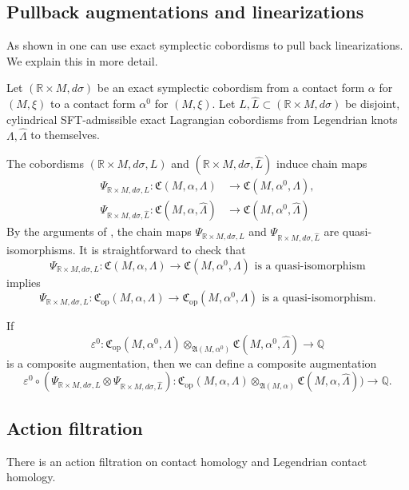 \documentclass[10pt]{amsart}
\let\epsilon\varepsilon
\newcommand{\opp}{\mathrm{op}}
\theoremstyle{plain}
\theoremstyle{definition}
\numberwithin{equation}{subsection}
\newcommand{\RR}{\mathbb{R}}
\begin{document}
\subsection{Pullback augmentations and linearizations}

As shown in \cite{BEE} one can use exact symplectic cobordisms to pull back linearizations. We explain this in more detail.

Let $(\mathbb{R}\times M,d\sigma)$ be an exact symplectic cobordism from a contact form $\alpha$ for $(M,\xi)$ to a contact form $\alpha^0$ for $(M,\xi)$. Let $L,\widehat{L} \subset (\mathbb{R}\times M,d\sigma)$ be disjoint, \hbox{cylindrical} SFT\nobreakdash-admissible exact Lagrangian cobordisms from Legendrian knots $\Lambda,\widehat{\Lambda}$ to themselves.

The cobordisms $(\RR\times M,d\sigma,L)$ and $(\RR\times M,d\sigma,\widehat{L})$ induce chain maps
\begin{align*}
\Psi_{\RR\times M,d\sigma,L}:\mathfrak{C}(M,\alpha,\Lambda) &\to \mathfrak{C}(M,\alpha^0,\Lambda),\\
\Psi_{\RR\times M, d\sigma,\widehat{L}}: \mathfrak{C}(M,\alpha,\widehat\Lambda) &\to \mathfrak{C}(M,\alpha^0,\widehat\Lambda)
\end{align*}
By the arguments of \cite{BEE,SFT}, the chain maps $\Psi_{\RR\times M,d\sigma,L}$ and $\Psi_{\RR\times M,d\sigma,\widehat{L}}$ are quasi-isomorphisms. It is straightforward to check that
$$\Psi_{\RR\times M,d\sigma,L}:\mathfrak{C}(M,\alpha,\Lambda) \to \mathfrak{C}(M,\alpha^0,\Lambda)\text{ is a quasi-isomorphism}$$ implies $$\Psi_{\RR\times M,d\sigma,L}:\mathfrak{C}_{\opp}(M,\alpha,\Lambda) \to \mathfrak{C}_{\opp}(M,\alpha^0,\Lambda)\text{ is a quasi-isomorphism.}$$

If $$\epsilon^0 : \mathfrak{C}_{\opp}(M,\alpha^0,\Lambda)\otimes_{\mathfrak{A}(M,\alpha^0)} \mathfrak{C}(M,\alpha^0,\widehat{\Lambda}) \to \mathbb{Q}$$
is a composite augmentation, then we can define a composite augmentation
$$\epsilon^0 \circ (\Psi_{\RR\times M,d\sigma,L}\otimes \Psi_{\RR\times M, d\sigma,\widehat{L}}): \mathfrak{C}_{\opp}(M,\alpha,\Lambda)\otimes_{\mathfrak{A}(M,\alpha)} \mathfrak{C}(M,\alpha,\widehat{\Lambda})) \to \mathbb{Q}.$$

\subsection{Action filtration}

There is an action filtration on contact homology and Legendrian contact homology.
\end{document}
